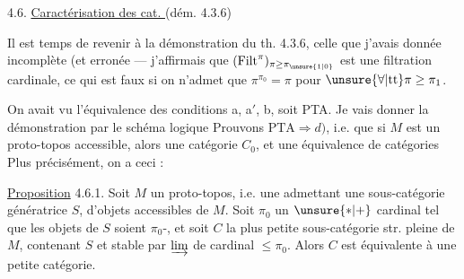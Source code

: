 4.6. \uline{Caractérisation des cat. } (dém.  4.3.6)

 Il est temps de revenir à la démonstration du th. 4.3.6,  celle que j'avais donnée  incomplète (et erronée --- j'affirmais que $(\mathrm{Filt}^\pi)_{\pi\geq\pi_{\unsure{1|0}}}$ est une filtration cardinale, ce qui est faux si on n'admet que $\pi^{\pi_0}=\pi$ pour $\unsure{\forall|\mathrm{tt}}\pi\geq\pi_1$.

On avait vu l'équivalence des conditions a, a$'$, b, soit PTA. Je vais donner la démonstration par le schéma logique
Prouvons $\mathrm{PTA}\Rightarrow d)$, i.e. que si $M$ est un proto-topos accessible, alors    une   catégorie $C_0$,   et une équivalence de catégories
Plus précisément, on a ceci :

\uline{Proposition} 4.6.1. Soit $M$ un proto-topos, i.e. une   admettant une  sous-catégorie  génératrice $S$,  d'objets accessibles de $M$. Soit $\pi_0$ un $\unsure{*|+}$ cardinal tel que les objets de $S$ soient $\pi_0$-,   et soit $C$ la plus petite sous-catégorie str. pleine de $M$, contenant  $S$ et stable par $\varinjlim$ de cardinal $\leq\pi_0$. Alors
 $C$ est équivalente à une petite catégorie.
